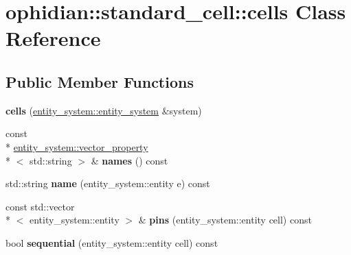 \hypertarget{classophidian_1_1standard__cell_1_1cells}{\section{ophidian\-:\-:standard\-\_\-cell\-:\-:cells Class Reference}
\label{classophidian_1_1standard__cell_1_1cells}
}
\subsection*{Public Member Functions}
\begin{DoxyCompactItemize}
\item 
\hypertarget{classophidian_1_1standard__cell_1_1cells_a1ca2fdb887bc2f348dc3d1e04f70183e}{{\bfseries cells} (\hyperlink{classophidian_1_1entity__system_1_1entity__system}{entity\-\_\-system\-::entity\-\_\-system} \&system)}\label{classophidian_1_1standard__cell_1_1cells_a1ca2fdb887bc2f348dc3d1e04f70183e}

\item 
\hypertarget{classophidian_1_1standard__cell_1_1cells_aa33670b2577ba2861aed30f8bdca830d}{const \\*
\hyperlink{classophidian_1_1entity__system_1_1vector__property}{entity\-\_\-system\-::vector\-\_\-property}\\*
$<$ std\-::string $>$ \& {\bfseries names} () const }\label{classophidian_1_1standard__cell_1_1cells_aa33670b2577ba2861aed30f8bdca830d}

\item 
\hypertarget{classophidian_1_1standard__cell_1_1cells_aa4a3f7b144785c3a2796ab1472a65645}{std\-::string {\bfseries name} (entity\-\_\-system\-::entity e) const }\label{classophidian_1_1standard__cell_1_1cells_aa4a3f7b144785c3a2796ab1472a65645}

\item 
\hypertarget{classophidian_1_1standard__cell_1_1cells_ad86e9e14915dc251c862f713c4807d0f}{const std\-::vector\\*
$<$ entity\-\_\-system\-::entity $>$ \& {\bfseries pins} (entity\-\_\-system\-::entity cell) const }\label{classophidian_1_1standard__cell_1_1cells_ad86e9e14915dc251c862f713c4807d0f}

\item 
\hypertarget{classophidian_1_1standard__cell_1_1cells_a1627ab77d6d0e0c5e45b030504e91fb9}{bool {\bfseries sequential} (entity\-\_\-system\-::entity cell) const }\label{classophidian_1_1standard__cell_1_1cells_a1627ab77d6d0e0c5e45b030504e91fb9}


\end{DoxyCompactItemize}
